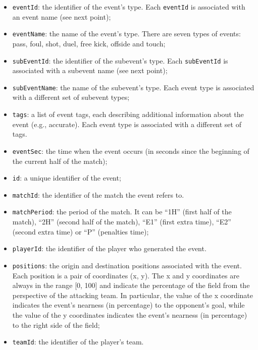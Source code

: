 \documentclass{l4proj}
\begin{document}
\begin{itemize}
    \item \texttt{eventId}: the identifier of the event’s type. Each \texttt{eventId} is associated with an event name (see next point);

    \item \texttt{eventName}: the name of the event’s type. There are seven types of events: pass, foul, shot, duel, free kick, offside and touch;

    \item \texttt{subEventId}: the identifier of the subevent’s type. Each \texttt{subEventId} is associated with a subevent name (see next point);

    \item \texttt{subEventName}: the name of the subevent’s type. Each event type is associated with a different set of subevent types;

    \item \texttt{tags}: a list of event tags, each describing additional information about the event (e.g., accurate). Each event type is associated with a different set of tags.

    \item \texttt{eventSec}: the time when the event occurs (in seconds since the beginning of the current half of the match);

    \item \texttt{id}: a unique identifier of the event;

    \item \texttt{matchId}: the identifier of the match the event refers to. 

    \item \texttt{matchPeriod}: the period of the match. It can be “1H” (first half of the match), “2H” (second half of the match), “E1” (first extra time), “E2” (second extra time) or “P” (penalties time);

    \item \texttt{playerId}: the identifier of the player who generated the event.

    \item \texttt{positions}: the origin and destination positions associated with the event. Each position is a pair of coordinates (x, y). The x and y coordinates are always in the range [0, 100] and indicate the percentage of the field from the perspective of the attacking team. In particular, the value of the x coordinate indicates the event’s nearness (in percentage) to the opponent’s goal, while the value of the y coordinates indicates the event’s nearness (in percentage) to the right side of the field;

    \item \texttt{teamId}: the identifier of the player’s team. 

\end{itemize}
\end{document}
